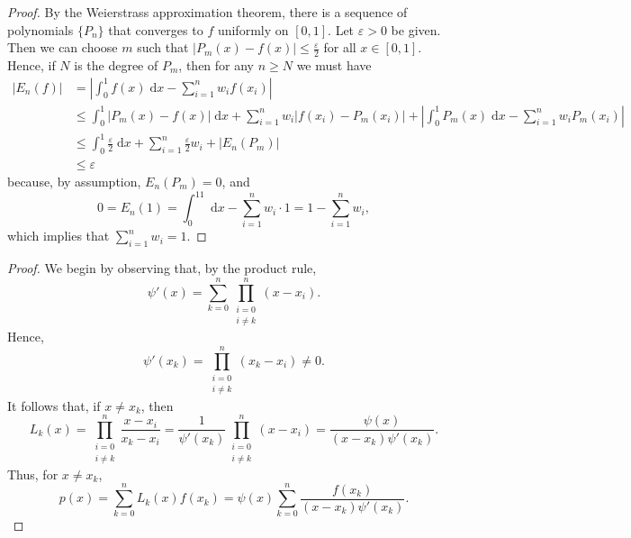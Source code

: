 \documentclass{homework}
\begin{document}
	\maketitle
	
	\question
	\begin{proof}
		By the Weierstrass approximation theorem, there is a sequence of polynomials $\{P_n\}$ that converges to $f$ uniformly on $[0,1]$. Let $\varepsilon > 0$ be given. Then we can choose $m$ such that $|P_m(x) -f(x)| \le \frac{\varepsilon}{2}$ for all $x \in [0,1]$. Hence, if $N$ is the degree of $P_m$, then for any $n\ge N$ we must have
		\begin{align*}
			|E_n(f)| &= \left|\int_0^1f(x)\;\text{d}x - \sum_{i=1}^nw_if(x_i)\right| \\
			&\le \int_0^1|P_m(x) - f(x)|\;\text{d}x + \sum_{i=1}^nw_i\left|f(x_i) - P_m(x_i)\right| +\left|\int_0^1P_m(x)\;\text{d}x - \sum_{i=1}^nw_iP_m(x_i)\right| \\
			&\le \int_0^1\frac{\varepsilon}{2}\;\text{d}x + \sum_{i=1}^n\frac{\varepsilon}{2} w_i + \left|E_n(P_m)\right| \\
			&\le \varepsilon
		\end{align*}
		because, by assumption, $E_n(P_m) = 0$, and
		\begin{equation*}
			0 = E_n(1) = \int_0^11\;\text{d}x - \sum_{i=1}^nw_i\cdot 1 = 1 - \sum_{i=1}^nw_i,
		\end{equation*}
		which implies that $\sum\limits_{i=1}^nw_i = 1$.
	\end{proof}
	
	\question 
	\begin{proof}
		We begin by observing that, by the product rule,
		\begin{equation*}
			\psi'(x) = \sum_{k=0}^n\prod_{\substack{i=0\\i\ne k}}^n (x - x_i).
		\end{equation*}
		Hence,
		\begin{equation*}
			\psi'(x_k) = \prod_{\substack{i=0\\i\ne k}}^n (x_k-x_i) \ne 0.
		\end{equation*}
		It follows that, if $x \ne x_k$, then
		\begin{equation*}
			L_k(x) = \prod_{\substack{i=0\\i\ne k}}^n \frac{x-x_i}{x_k-x_i} = \frac{1}{\psi'(x_k)}\prod_{\substack{i=0\\i\ne k}}^n (x-x_i) = \frac{\psi(x)}{(x-x_k)\psi'(x_k)}.
		\end{equation*}
		Thus, for $x\ne x_k$,
		\begin{equation*}
			p(x) = \sum_{k=0}^nL_k(x)f(x_k) = \psi(x)\sum_{k=0}^n\frac{f(x_k)}{(x-x_k)\psi'(x_k)}.
		\end{equation*}
	\end{proof}
	
\end{document}
